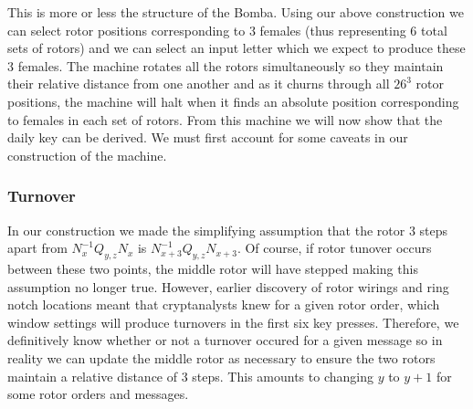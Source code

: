 \noindent This is more or less the structure of the Bomba. Using our
above construction we can select rotor positions corresponding to 3
females (thus representing 6 total sets of rotors) and we can select
an input letter which we expect to produce these 3 females. The
machine rotates all the rotors simultaneously so they maintain their
relative distance from one another and as it churns through all
$26^3$ rotor positions, the machine will halt when it finds an
absolute position corresponding to females in each set of rotors.
From this machine we will now show that the daily key can be derived.
We must first account for some caveats in our construction of the machine.

\subsubsection{Turnover}
In our construction we made the simplifying assumption that the rotor
3 steps apart from $N_{x}^{-1}Q_{y,z}N_{x}$ is
$N_{x+3}^{-1}Q_{y,z}N_{x+3}$. Of course, if rotor tunover occurs
between these two points, the middle rotor will have stepped making
this assumption no longer true. However, earlier discovery of rotor
wirings and ring notch locations meant that cryptanalysts knew for a
given rotor order, which window settings will produce turnovers in
the first six key presses. Therefore, we definitively know whether or
not a turnover occured for a given message so in reality we can
update the middle rotor as necessary to ensure the two rotors
maintain a relative distance of 3 steps. This amounts to changing $y$
to $y+1$ for some rotor orders and messages.
